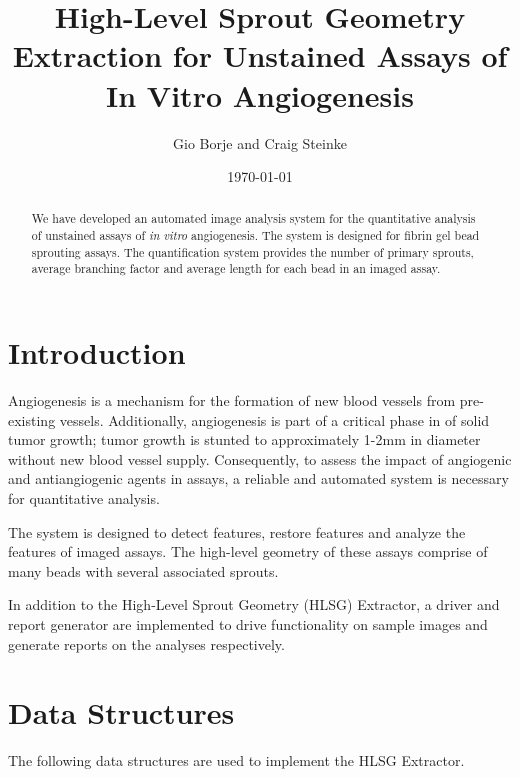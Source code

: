 \documentclass{sig-alternate}
\begin{document}
\title{High-Level Sprout Geometry Extraction for Unstained Assays of In Vitro Angiogenesis}
\author{
	Gio Borje and Craig Steinke \\
}
\date{\today}
\maketitle

\begin{abstract}
	We have developed an automated image analysis system for the quantitative
	analysis of unstained assays of \emph{in vitro} angiogenesis. The system is
	designed for fibrin gel bead sprouting assays. The quantification system
	provides the number of primary sprouts, average branching factor and
	average length for each bead in an imaged assay.
\end{abstract}

\section{Introduction} %
\label{sec:Introduction}
	Angiogenesis is a mechanism for the formation of new blood vessels from
	pre-existing vessels. Additionally, angiogenesis is part of a critical
	phase in of solid tumor growth; tumor growth is stunted to
	approximately 1-2mm in diameter without new blood vessel supply.
	Consequently, to assess the impact of angiogenic and antiangiogenic
	agents in assays, a reliable and automated system is necessary for
	quantitative analysis.

	The system is designed to detect features, restore features and analyze
	the features of imaged assays. The high-level geometry of these assays
	comprise of many beads with several associated sprouts.

	In addition to the High-Level Sprout Geometry (HLSG) Extractor, a
	driver and report generator are implemented to drive functionality on
	sample images and generate reports on the analyses respectively.

\section{Data Structures} %
\label{sec:Data Structures}
	The following data structures are used to implement the HLSG Extractor.
\end{document}
